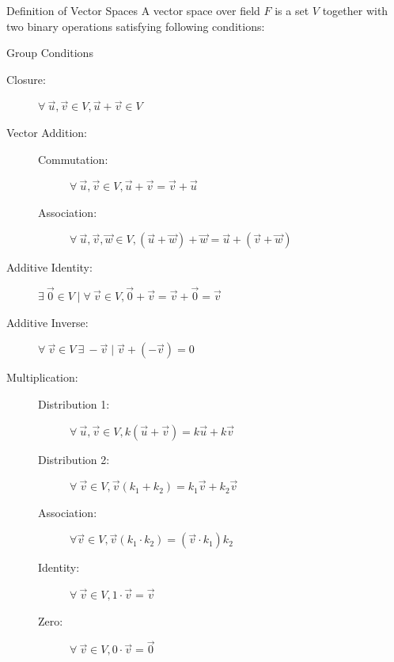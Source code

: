 \documentclass{beamer}
\begin{document}
\begin{frame}{Definition of Vector Spaces}
    A vector space over field $F$ is a set $V$ together with two binary operations satisfying following conditions:
    \begin{block}{Group Conditions}
        {\tiny
            \begin{description}
                \item [Closure: ] $\forall\ \vec{u}, \vec{v} \in V, \vec{u} + \vec{v} \in V$
                \item [Vector Addition:]\hfill
                \begin{description}
                    \item [Commutation: ] $\forall\ \vec{u}, \vec{v} \in V, \vec{u}+\vec{v}=\vec{v}+\vec{u}$
                    \item [Association: ] $\forall\ \vec{u}, \vec{v}, \vec{w} \in V, (\vec{u} + \vec{w}) + \vec{w} = \vec{u} + (\vec{v} + \vec{w})$
                \end{description}
                \item [Additive Identity: ] $\exists\ \vec{0} \in V \mid \forall\ \vec{v} \in V, \vec{0} + \vec{v} = \vec{v} + \vec{0} = \vec{v}$
                \item [Additive Inverse: ] $\forall\ \vec{v} \in V\ \exists\ -\vec{v} \mid \vec{v}+(-\vec{v}) =0$
                \item [Multiplication: ]\hfill
                \begin{description}
                    \item [Distribution 1: ] $\forall\ \vec{u}, \vec{v} \in V, k(\vec{u}+\vec{v}) = k\vec{u}+k\vec{v}$
                    \item [Distribution 2: ] $\forall\ \vec{v} \in V, \vec{v}(k_1+k_2)=k_1\vec{v}+k_2\vec{v}$
                    \item [Association: ] $\forall \vec{v} \in V, \vec{v}(k_1\cdot k_2)=(\vec{v}\cdot k_1)k_2$
                    \item [Identity: ] $\forall\ \vec{v} \in V, 1\cdot \vec{v}=\vec{v}$
                    \item [Zero: ] $\forall\ \vec{v} \in V, 0\cdot\vec{v} = \vec{0}$
                \end{description}
            \end{description}
        }
    \end{block}
\end{frame}
\end{document}
